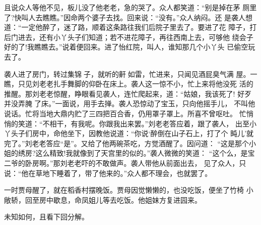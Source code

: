 且说众人等他不见，板儿没了他老老，急的哭了。众人都笑道：“别是掉在茅
厕里了?快叫人去瞧瞧。”因命两个婆子去找。回来说：“没有。”众人纳闷。还
是袭人想道：“一定他醉了，迷了路，顺着这条路往我们后院子里去了。要进了花
障子，打后门进去，还有小丫头子们知道；若不进花障子，再往西南上去，可够他
绕会子好的了!我瞧瞧去。”说着便回来。进了怡红院，叫人，谁知那几个小丫头
已偷空玩去了。

袭人进了房门，转过集锦子，就听的鼾如雷，忙进来，只闻见酒屁臭气满
屋。一瞧，只见刘老老扎手舞脚的仰卧在床上。袭人这一惊不小，忙上来将他没死
活的推醒。那刘老老惊醒，睁眼看见袭人，连忙爬起来，道：“姑娘，我该死了!
好歹并没弄腌了床。”一面说，用手去掸。袭人恐惊动了宝玉，只向他摇手儿，
不叫他说话。忙将当地大鼎内贮了三四把百合香，仍用罩子罩上。所喜不曾呕吐。
忙悄悄的笑道：“不相干，有我呢。你跟我出来罢。”刘老老答应着，跟了袭人，
出至小丫头子们房中，命他坐下，因教他说道：“你说‘醉倒在山子石上，打了个
盹儿’就完了。”刘老老答应“是”。又给了他两碗茶吃，方觉酒醒了。因问道：
“这是那个小姐的绣房?这么精致!我就像到了天宫里的似的。”袭人微微的笑道：
“这个么，是宝二爷的卧房啊。”那刘老老吓的不敢做声。袭人带他从前面出去，
见了众人，只说：“他在草地下睡着了，带了他来的。”众人都不理会，也就罢了。

一时贾母醒了，就在稻香村摆晚饭。贾母因觉懒懒的，也没吃饭，便坐了竹椅
小敞轿，回至房中歇息，命凤姐儿等去吃饭。他姐妹方复进园来。

未知如何，且看下回分解。